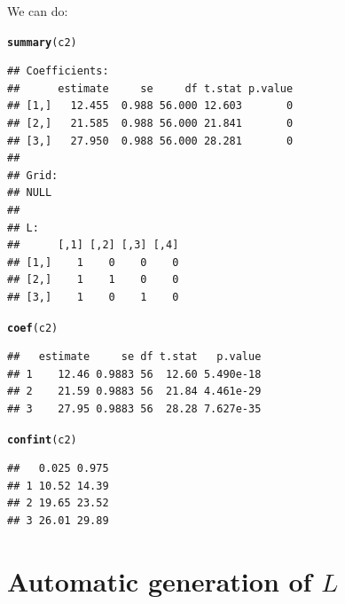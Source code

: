 \documentclass[10pt]{article}\usepackage[]{graphicx}\usepackage[]{color}
\makeatletter
\newcommand{\hlstd}[1]{\textcolor[rgb]{0.345,0.345,0.345}{#1}}%
\newcommand{\hlkwd}[1]{\textcolor[rgb]{0.737,0.353,0.396}{\textbf{#1}}}%
\newenvironment{kframe}{%
 \def\at@end@of@kframe{}%
 \ifinner\ifhmode%
  \def\at@end@of@kframe{\end{minipage}}%
  \begin{minipage}{\columnwidth}%
 \fi\fi%
 \def\FrameCommand##1{\hskip\@totalleftmargin \hskip-\fboxsep
 \colorbox{shadecolor}{##1}\hskip-\fboxsep
     \hskip-\linewidth \hskip-\@totalleftmargin \hskip\columnwidth}%
 \MakeFramed {\advance\hsize-\width
   \@totalleftmargin\z@ \linewidth\hsize
   \@setminipage}}%
 {\par\unskip\endMakeFramed%
 \at@end@of@kframe}
\newenvironment{knitrout}{}{} %
\makeatother
\begin{document}
We can do:

\begin{knitrout}
\color{fgcolor}\begin{kframe}
\begin{alltt}
\hlkwd{summary}\hlstd{(c2)}
\end{alltt}
\begin{verbatim}
## Coefficients:
##      estimate     se     df t.stat p.value
## [1,]   12.455  0.988 56.000 12.603       0
## [2,]   21.585  0.988 56.000 21.841       0
## [3,]   27.950  0.988 56.000 28.281       0
## 
## Grid:
## NULL
## 
## L:
##      [,1] [,2] [,3] [,4]
## [1,]    1    0    0    0
## [2,]    1    1    0    0
## [3,]    1    0    1    0
\end{verbatim}
\begin{alltt}
\hlkwd{coef}\hlstd{(c2)}
\end{alltt}
\begin{verbatim}
##   estimate     se df t.stat   p.value
## 1    12.46 0.9883 56  12.60 5.490e-18
## 2    21.59 0.9883 56  21.84 4.461e-29
## 3    27.95 0.9883 56  28.28 7.627e-35
\end{verbatim}
\begin{alltt}
\hlkwd{confint}\hlstd{(c2)}
\end{alltt}
\begin{verbatim}
##   0.025 0.975
## 1 10.52 14.39
## 2 19.65 23.52
## 3 26.01 29.89
\end{verbatim}
\end{kframe}
\end{knitrout}

\section{Automatic generation of $L$}
\label{sec:autom-gener-l}
\end{document}
